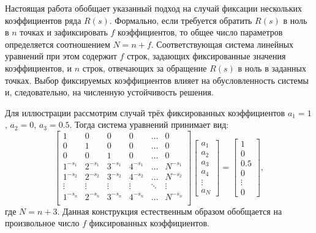 \documentclass[intlimits,twoside,a4paper,11pt]{article}
\begin{document}
        Настоящая работа обобщает указанный подход на случай фиксации нескольких коэффициентов ряда $R(s)$.
        Формально, если требуется обратить $R(s)$ в ноль в $n$ точках и зафиксировать $f$ коэффициентов, 
        то общее число параметров определяется соотношением $N = n + f$. Соответствующая система линейных уравнений 
        при этом содержит $f$ строк, задающих фиксированные значения коэффициентов, и $n$ строк, отвечающих за 
        обращение $R(s)$ в ноль в заданных точках. Выбор фиксируемых коэффициентов влияет на 
        обусловленность системы и, следовательно, на численную устойчивость решения. 

        Для иллюстрации рассмотрим случай трёх фиксированных коэффициентов $a_1=1$, $a_2=0$, $a_3=0.5$. Тогда система уравнений принимает вид:
        \begin{equation}\label{eq:second_system}
        \begin{bmatrix}
        1 & 0 & 0 & 0 & \dots & 0 \\
        0 & 1 & 0 & 0 & \dots & 0 \\
        0 & 0 & 1 & 0 & \dots & 0 \\
        1^{-s_1} & 2^{-s_1} & 3^{-s_1} & 4^{-s_1} & \dots & N^{-s_1}\\
        1^{-s_2} & 2^{-s_2} & 3^{-s_2} & 4^{-s_2} & \dots & N^{-s_2}\\
        \vdots & \vdots & \vdots & \vdots & \ddots & \vdots \\
        1^{-s_{n}} & 2^{-s_{n}} & 3^{-s_{n}} & 4^{-s_{n}} & \dots & N^{-s_{n}} \\
        \end{bmatrix}
        \begin{bmatrix} 
        a_1 \\ a_2 \\ a_3 \\ a_4 \\ \vdots \\ a_N 
        \end{bmatrix}
        =
        \begin{bmatrix} 
        1 \\ 0 \\ 0.5 \\ 0 \\ \vdots \\ 0 
        \end{bmatrix},
        \end{equation}
        где $N = n + 3$. Данная конструкция естественным образом обобщается на произвольное число $f$ фиксированных коэффициентов.
  
\end{document}
